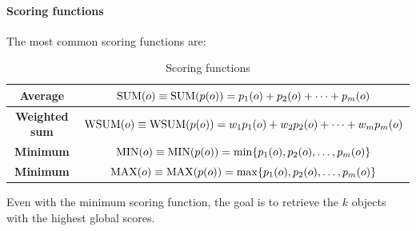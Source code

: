 \paragraph*{Scoring functions}
The most common scoring functions are: 
\renewcommand*{\arraystretch}{2}
\begin{table}[H]
    \centering
    \begin{tabular}{|cc|}
    \hline
    \textbf{Average}                                & $\textnormal{SUM}(o) \equiv \textnormal{SUM}(p(o)) = p_1(o) + p_2(o) + \dots + p_m(o)$                                                 \\ \hline
    \textbf{Weighted sum}                     & $\textnormal{WSUM}(o) \equiv \textnormal{WSUM}(p(o)) = w_1p_1(o) + w_2p_2(o) + \dots + w_mp_m(o)$                                                 \\ \hline
    \textbf{Minimum}                       & $\textnormal{MIN}(o) \equiv \textnormal{MIN}(p(o)) = \min\{p_1(o),p_2(o),\dots, p_m(o)\}$ \\ \hline
    \textbf{Minimum}                       & $\textnormal{MAX}(o) \equiv \textnormal{MAX}(p(o)) = \max\{p_1(o),p_2(o),\dots, p_m(o)\}$ \\ \hline   
    \end{tabular}
    \caption{Scoring functions}
\end{table}
\renewcommand*{\arraystretch}{1}
Even with the minimum scoring function, the goal is to retrieve the $k$ objects with the highest global scores.

